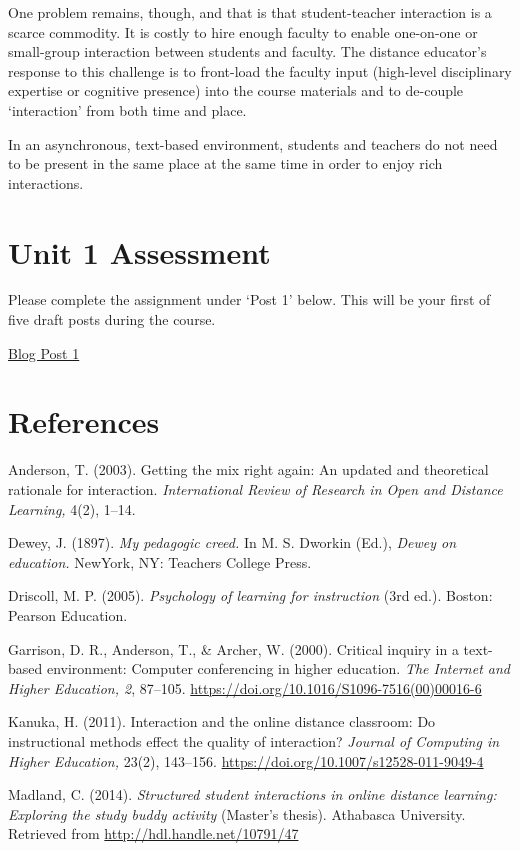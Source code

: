 \documentclass[
]{book}
\begin{document}
One problem remains, though, and that is that student-teacher interaction is a scarce commodity. It is costly to hire enough faculty to enable one-on-one or small-group interaction between students and faculty. The distance educator's response to this challenge is to front-load the faculty input (high-level disciplinary expertise or cognitive presence) into the course materials and to de-couple `interaction' from both time and place.

In an asynchronous, text-based environment, students and teachers do not need to be present in the same place at the same time in order to enjoy rich interactions.

\hypertarget{unit-1-assessment}{%
\section*{Unit 1 Assessment}\label{unit-1-assessment}}

Please complete the assignment under `Post 1' below. This will be your first of five draft posts during the course.

\href{assessments/\#blog}{Blog Post 1}

\hypertarget{references}{%
\section*{References}\label{references}}

Anderson, T. (2003). Getting the mix right again: An updated and theoretical rationale for interaction. \emph{International Review of Research in Open and Distance Learning,} 4(2), 1--14.

Dewey, J. (1897). \emph{My pedagogic creed.} In M. S. Dworkin (Ed.), \emph{Dewey on education.} NewYork, NY: Teachers College Press.

Driscoll, M. P. (2005). \emph{Psychology of learning for instruction} (3rd ed.). Boston: Pearson Education.

Garrison, D. R., Anderson, T., \& Archer, W. (2000). Critical inquiry in a text-based environment: Computer conferencing in higher education. \emph{The Internet and Higher Education, 2}, 87--105. \url{https://doi.org/10.1016/S1096-7516(00)00016-6}

Kanuka, H. (2011). Interaction and the online distance classroom: Do instructional methods effect the quality of interaction? \emph{Journal of Computing in Higher Education,} 23(2), 143--156. \url{https://doi.org/10.1007/s12528-011-9049-4}

Madland, C. (2014). \emph{Structured student interactions in online distance learning: Exploring the study buddy activity} (Master's thesis). Athabasca University. Retrieved from \url{http://hdl.handle.net/10791/47}

  
\end{document}

